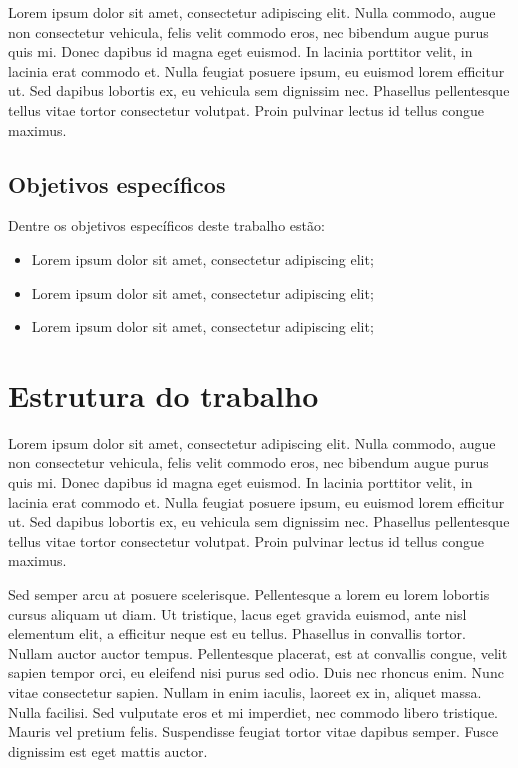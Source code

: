 \documentclass[brazil,hardcopy,openany,a4paper]{_ufscthesis}
\begin{document}
	Lorem ipsum dolor sit amet, consectetur adipiscing elit. Nulla commodo, augue non consectetur vehicula, felis velit commodo eros, nec bibendum augue purus quis mi. Donec dapibus id magna eget euismod. In lacinia porttitor velit, in lacinia erat commodo et. Nulla feugiat posuere ipsum, eu euismod lorem efficitur ut. Sed dapibus lobortis ex, eu vehicula sem dignissim nec. Phasellus pellentesque tellus vitae tortor consectetur volutpat. Proin pulvinar lectus id tellus congue maximus.
	
		\subsection{Objetivos específicos}
	
	Dentre os objetivos específicos deste trabalho estão:

		\begin{itemize}
			\item Lorem ipsum dolor sit amet, consectetur adipiscing elit;
			\item Lorem ipsum dolor sit amet, consectetur adipiscing elit;
			\item Lorem ipsum dolor sit amet, consectetur adipiscing elit;
		\end{itemize}
	
	\section{Estrutura do trabalho}
	
	Lorem ipsum dolor sit amet, consectetur adipiscing elit. Nulla commodo, augue non consectetur vehicula, felis velit commodo eros, nec bibendum augue purus quis mi. Donec dapibus id magna eget euismod. In lacinia porttitor velit, in lacinia erat commodo et. Nulla feugiat posuere ipsum, eu euismod lorem efficitur ut. Sed dapibus lobortis ex, eu vehicula sem dignissim nec. Phasellus pellentesque tellus vitae tortor consectetur volutpat. Proin pulvinar lectus id tellus congue maximus.

	Sed semper arcu at posuere scelerisque. Pellentesque a lorem eu lorem lobortis cursus aliquam ut diam. Ut tristique, lacus eget gravida euismod, ante nisl elementum elit, a efficitur neque est eu tellus. Phasellus in convallis tortor. Nullam auctor auctor tempus. Pellentesque placerat, est at convallis congue, velit sapien tempor orci, eu eleifend nisi purus sed odio. Duis nec rhoncus enim. Nunc vitae consectetur sapien. Nullam in enim iaculis, laoreet ex in, aliquet massa. Nulla facilisi. Sed vulputate eros et mi imperdiet, nec commodo libero tristique. Mauris vel pretium felis. Suspendisse feugiat tortor vitae dapibus semper. Fusce dignissim est eget mattis auctor.
\end{document}
